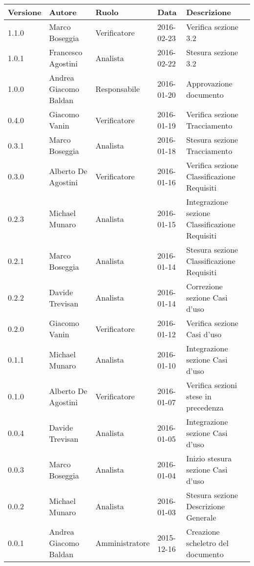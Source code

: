 \documentclass{scalatekids-article}
\begin{document}
\begin{center}
  \begin{tabular}{| l | l | l | l | p{5cm} |}
    \hline
    Versione & Autore & Ruolo & Data & Descrizione \\
    \hline
    1.1.0 & Marco Boseggia & Verificatore & 2016-02-23 & Verifica sezione 3.2\\
    \hline
    1.0.1 & Francesco Agostini & Analista & 2016-02-22 & Stesura sezione 3.2\\
    \hline
    1.0.0 & Andrea Giacomo Baldan & Responsabile & 2016-01-20 & Approvazione documento\\
    \hline
    0.4.0 & Giacomo Vanin & Verificatore & 2016-01-19 & Verifica sezione Tracciamento\\
    \hline
    0.3.1 & Marco Boseggia & Analista & 2016-01-18 & Stesura sezione Tracciamento\\
    \hline
    0.3.0 & Alberto De Agostini & Verificatore & 2016-01-16 & Verifica sezione Classificazione Requisiti\\
    \hline
    0.2.3 & Michael Munaro & Analista & 2016-01-15 & Integrazione sezione Classificazione Requisiti\\
    \hline
    0.2.1 & Marco Boseggia & Analista & 2016-01-14 & Stesura sezione Classificazione Requisiti\\
    \hline
    0.2.2 & Davide Trevisan & Analista & 2016-01-14 & Correzione sezione Casi d'uso\\
    \hline
    0.2.0 & Giacomo Vanin & Verificatore & 2016-01-12 & Verifica sezione Casi d'uso\\
    \hline
    0.1.1 & Michael Munaro & Analista & 2016-01-10 & Integrazione sezione Casi d'uso\\
    \hline
    0.1.0 & Alberto De Agostini & Verificatore & 2016-01-07 & Verifica sezioni stese in precedenza\\
    \hline
    0.0.4 & Davide Trevisan & Analista & 2016-01-05 & Integrazione sezione Casi d'uso\\
    \hline
    0.0.3 & Marco Boseggia & Analista & 2016-01-04 & Inizio stesura sezione Casi d'uso\\
    \hline
    0.0.2 & Michael Munaro & Analista & 2016-01-03 & Stesura sezione Descrizione Generale\\
    \hline
    0.0.1 & Andrea Giacomo Baldan & Amministratore & 2015-12-16 & Creazione scheletro del documento\\
    \hline
  \end{tabular}
\end{center}
\tableofcontents
\newpage
{}
\end{document}
